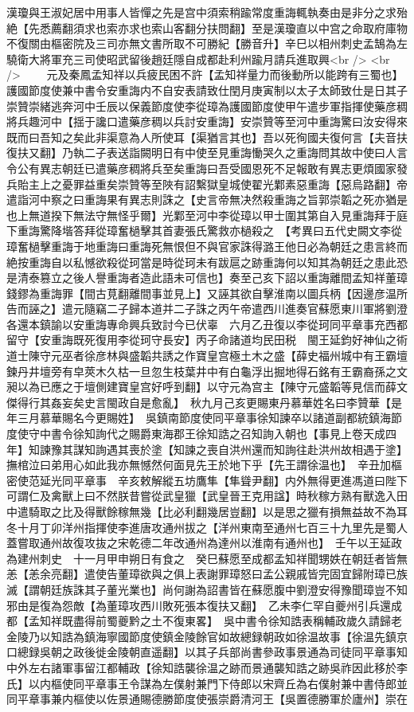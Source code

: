 漢瓊與王淑妃居中用事人皆憚之先是宫中須索稍踰常度重誨輒執奏由是非分之求殆絶【先悉薦翻須求也索亦求也索山客翻分扶問翻】至是漢瓊直以中宫之命取府庫物不復關由樞密院及三司亦無文書所取不可勝紀【勝音升】辛巳以相州刺史孟鵠為左驍衛大將軍充三司使昭武留後趙廷隱自成都赴利州踰月請兵進取興<br />
<br />
　　元及秦鳳孟知祥以兵疲民困不許【孟知祥量力而後動所以能跨有三蜀也】　護國節度使兼中書令安重誨内不自安表請致仕閏月庚寅制以太子太師致仕是日其子崇贊崇緒逃奔河中壬辰以保義節度使李從璋為護國節度使甲午遣步軍指揮使藥彦稠將兵趣河中【揺于讒口遣藥彦稠以兵討安重誨】安崇贊等至河中重誨驚曰汝安得來既而曰吾知之矣此非渠意為人所使耳【渠猶言其也】吾以死徇國夫復何言【夫音扶復扶又翻】乃執二子表送詣闕明日有中使至見重誨慟哭久之重誨問其故中使曰人言令公有異志朝廷已遣藥彦稠將兵至矣重誨曰吾受國恩死不足報敢有異志更煩國家發兵貽主上之憂罪益重矣崇贊等至陜有詔繫獄皇城使翟光鄴素惡重誨【惡烏路翻】帝遣詣河中察之曰重誨果有異志則誅之【史言帝無决然殺重誨之旨郭崇韜之死亦猶是也上無道揆下無法守無怪乎爾】光鄴至河中李從璋以甲士圍其第自入見重誨拜于庭下重誨驚降堦答拜從璋奮檛擊其首妻張氏驚救亦檛殺之　【考異曰五代史闕文李從璋奮檛擊重誨于地重誨曰重誨死無恨但不與官家誅得潞王他日必為朝廷之患言終而絶按重誨自以私憾欲殺從珂當是時從珂未有跋扈之跡重誨何以知其為朝廷之患此恐是清泰篡立之後人譽重誨者造此語未可信也】奏至己亥下詔以重誨離間孟知祥董璋錢鏐為重誨罪【間古莧翻離間事並見上】又誣其欲自擊淮南以圖兵柄【因邊彦温所告而誣之】遣元隨竊二子歸本道并二子誅之丙午帝遣西川進奏官蘇愿東川軍將劉澄各還本鎮諭以安重誨專命興兵致討今已伏辜　六月乙丑復以李從珂同平章事充西都留守【安重誨既死復用李從珂守長安】丙子命諸道均民田税　閩王延鈞好神仙之術道士陳守元巫者徐彦林與盛韜共誘之作寶皇宫極土木之盛【薛史福州城中有王霸壇鍊丹井壇旁有皁莢木久枯一旦忽生枝葉井中有白龜浮出掘地得石銘有王霸裔孫之文昶以為已應之于壇側建寶皇宫好呼到翻】以守元為宫主【陳守元盛韜等見信而薛文傑得行其姦妄矣史言閩政自是愈亂】　秋九月己亥更賜東丹慕華姓名曰李贊華【是年三月慕華賜名今更賜姓】　吳鎮南節度使同平章事徐知諫卒以諸道副都統鎮海節度使守中書令徐知詢代之賜爵東海郡王徐知誥之召知詢入朝也【事見上卷天成四年】知諫豫其謀知詢遇其喪於塗【知諫之喪自洪州還而知詢往赴洪州故相遇于塗】撫棺泣曰弟用心如此我亦無憾然何面見先王於地下乎【先王謂徐温也】　辛丑加樞密使范延光同平章事　辛亥敕解縱五坊鷹隼【隼聳尹翻】内外無得更進馮道曰陛下可謂仁及禽獸上曰不然朕昔嘗從武皇獵【武皇晉王克用諡】時秋稼方熟有獸逸入田中遣騎取之比及得獸餘稼無幾【比必利翻幾居豈翻】以是思之獵有損無益故不為耳　冬十月丁卯洋州指揮使李進唐攻通州拔之【洋州東南至通州七百三十九里先是蜀人蓋嘗取通州故復攻抜之宋乾德二年改通州為達州以淮南有通州也】　壬午以王延政為建州刺史　十一月甲申朔日有食之　癸巳蘇愿至成都孟知祥聞甥妷在朝廷者皆無恙【恙余亮翻】遣使告董璋欲與之俱上表謝罪璋怒曰孟公親戚皆完固宜歸附璋已族滅【謂朝廷族誅其子董光業也】尚何謝為詔書皆在蘇愿腹中劉澄安得豫聞璋豈不知邪由是復為怨敵【為董璋攻西川敗死張本復扶又翻】　乙未李仁罕自夔州引兵還成都【孟知祥既盡得前蜀夔黔之土不復東畧】　吳中書令徐知誥表稱輔政歲久請歸老金陵乃以知誥為鎮海寧國節度使鎮金陵餘官如故總録朝政如徐温故事【徐温先鎮京口總録吳朝之政後徙金陵朝直遥翻】以其子兵部尚書參政事景通為司徒同平章事知中外左右諸軍事留江都輔政【徐知誥襲徐温之跡而景通襲知誥之跡吳祚因此移於李氏】以内樞使同平章事王令謀為左僕射兼門下侍郎以宋齊丘為右僕射兼中書侍郎並同平章事兼内樞使以佐景通賜德勝節度使張崇爵清河王【吳置德勝軍於廬州】崇在